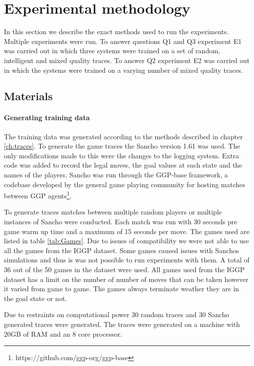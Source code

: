 \chapter{Experimental methodology}\label{ch:methodology}

In this section we describe the exact methods used to run the experiments. Multiple experiments were run. To answer questions Q1 and Q3 experiment E1 was carried out in which three systems were trained on a set of random, intelligent and mixed quality traces. To answer Q2 experiment E2 was carried out in which the systems were trained on a varying number of mixed quality traces.
\section{Materials}
\subsubsection{Generating training data}
The training data was generated according to the methods described in chapter \ref{ch:traces}. To generate the game traces the Sancho version 1.61 was used\cite{Sancho/Github}. The only modifications made to this were the changes to the logging system. Extra code was added to record the legal moves, the goal values at each state and the names of the players. Sancho was run through the GGP-base framework, a codebase developed by the general game playing community for hosting matches between GGP agents\footnote{https://github.com/ggp-org/ggp-base}.

To generate traces matches between multiple random players or multiple instances of Sancho were conducted. Each match was run with 30 seconds pre game warm up time and a maximum of 15 seconds per move. The games used are listed in table \ref{tab:Games}. Due to issues of compatibility we were not able to use all the games from the IGGP dataset. Some games caused issues with Sanchos simulations and thus is was not possible to run experiments with them. A total of 36 out of the 50 games in the dataset were used. All games used from the IGGP dataset has a limit on the number of number of moves that can be taken however it varied from game to game. The games always terminate weather they are in the goal state or not.

Due to restraints on computational power 30 random traces and 30 Sancho generated traces were generated. The traces were generated on a machine with 20GB of RAM and an 8 core processor. 

